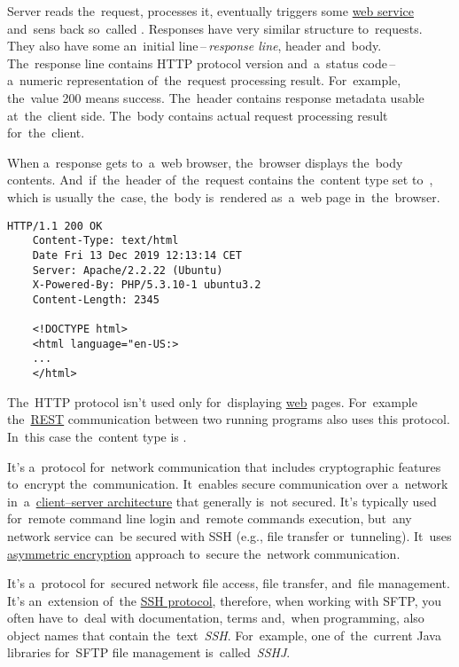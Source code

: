 Server reads the~request, processes it, eventually triggers some \hyperref[webserviceapplication]{web service} and~sens back so~called .
Responses have very similar structure to~requests.
They also have some an~initial line\,--\,\textit{response line}, header and~body.
The~response line contains HTTP protocol version and~a~status code\,--\, a~numeric representation of~the~request processing result.
For~example, the~value 200 means success.
The~header contains response metadata usable at~the~client side.
The~body contains actual request processing result for~the~client.

When a~response gets to~a~web browser, the~browser displays the~body contents.
And~if~the~header of~the~request contains the~content type set to~, which is usually the~case, the~body is~rendered as~a~web page in~the~browser.

\begin{lstlisting}[title={Example of a~HTTP response}]
    HTTP/1.1 200 OK
    Content-Type: text/html
    Date Fri 13 Dec 2019 12:13:14 CET
    Server: Apache/2.2.22 (Ubuntu)
    X-Powered-By: PHP/5.3.10-1 ubuntu3.2
    Content-Length: 2345

    <!DOCTYPE html>
    <html language="en-US:>
    ...
    </html>
\end{lstlisting}

\notenonl The~HTTP protocol isn't used only for~displaying \hyperref[internetweb]{web} pages.
For~example the~\hyperref[rest]{REST} communication between two running programs also uses this protocol.
In~this case the~content type is .

\label{smtp}

\label{ssh}
It's a~protocol for~network communication that includes cryptographic features to~encrypt the~communication.
It~enables secure communication over a~network in~a~\hyperref[clientserverarchitecture]{client--server architecture} that generally is~not secured.
It's typically used for~remote command line login and~remote commands execution, but~any network service can~be secured with SSH (e.g., file transfer or~tunneling).
It~uses \hyperref[asymmetricencryption]{asymmetric encryption} approach to~secure the~network communication.

\label{sftp}
It's a~protocol for~secured network file access, file transfer, and~file management.
It's an~extension of~the \hyperref[ssh]{SSH protocol}, therefore, when working with SFTP, you often have to~deal with documentation, terms and,~when programming, also object names that contain the~text~\textit{SSH}.
For~example, one of~the~current Java libraries for~SFTP file management is~called~\textit{SSHJ}.

